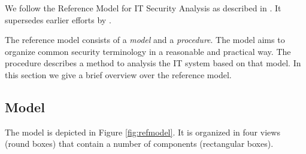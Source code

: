 We follow the Reference Model for IT Security Analysis as described in \cite{Grimm:ItSecRefModel}.
It supersedes earlier efforts by \cite{Avizienis}.

The reference model consists of a \emph{model} and a \emph{procedure}.
The model aims to organize common security terminology in a reasonable and practical way.
The procedure describes a method to analysis the IT system based on that model.
In this section we give a brief overview over the reference model.

\subsection{Model}



The model is depicted in Figure \ref{fig:refmodel}.
It is organized in four views (round boxes) that contain a number of components (rectangular boxes).


